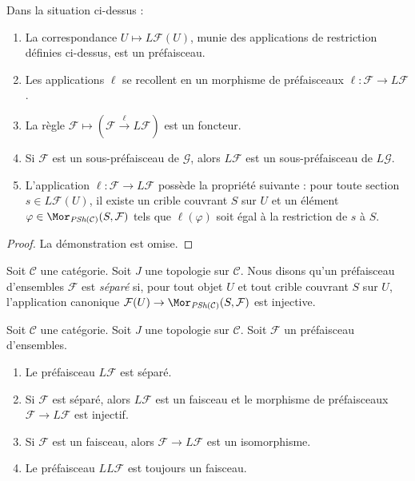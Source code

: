 \begin{lemma}
\label{lemma-L-presheaf}
Dans la situation ci-dessus :
\begin{enumerate}
\item La correspondance $U \mapsto L\mathcal{F}(U)$, munie des
applications de restriction définies ci-dessus, est un préfaisceau.
\item Les applications $\ell$ se recollent en un morphisme de préfaisceaux
$\ell : \mathcal{F} \to L\mathcal{F}$.
\item La règle $\mathcal{F} \mapsto (\mathcal{F} \xrightarrow{\ell}
L\mathcal{F})$ est un foncteur.
\item Si $\mathcal{F}$ est un sous-préfaisceau de $\mathcal{G}$, alors
$L\mathcal{F}$ est un sous-préfaisceau de $L\mathcal{G}$.
\item L'application $\ell : \mathcal{F} \to L\mathcal{F}$ possède la
propriété suivante : pour toute section $s \in L\mathcal{F}(U)$,
il existe un crible couvrant $S$ sur $U$ et un élément
$\varphi \in \Mor_{\textit{PSh}(\mathcal{C})}(S, \mathcal{F})$
tels que $\ell(\varphi)$ soit égal à la restriction de
$s$ à $S$.
\end{enumerate}
\end{lemma}

\begin{proof}
La démonstration est omise.
\end{proof}

\begin{definition}
\label{definition-presheaf-separated-topology}
Soit $\mathcal{C}$ une catégorie.
Soit $J$ une topologie sur $\mathcal{C}$.
Nous disons qu'un préfaisceau d'ensembles $\mathcal{F}$
est {\it séparé} si, pour tout objet $U$ et
tout crible couvrant $S$ sur $U$, l'application canonique
$\mathcal{F}(U) \to \Mor_{\textit{PSh}(\mathcal{C})}(S, \mathcal{F})$
est injective.
\end{definition}

\begin{theorem}
\label{theorem-L-topology}
Soit $\mathcal{C}$ une catégorie.
Soit $J$ une topologie sur $\mathcal{C}$.
Soit $\mathcal{F}$ un préfaisceau d'ensembles.
\begin{enumerate}
\item Le préfaisceau $L\mathcal{F}$ est séparé.
\item Si $\mathcal{F}$ est séparé, alors $L\mathcal{F}$ est un faisceau
et le morphisme de préfaisceaux $\mathcal{F} \to L\mathcal{F}$ est injectif.
\item Si $\mathcal{F}$ est un faisceau, alors $\mathcal{F} \to L\mathcal{F}$
est un isomorphisme.
\item Le préfaisceau $LL\mathcal{F}$ est toujours un faisceau.
\end{enumerate}
\end{theorem}

